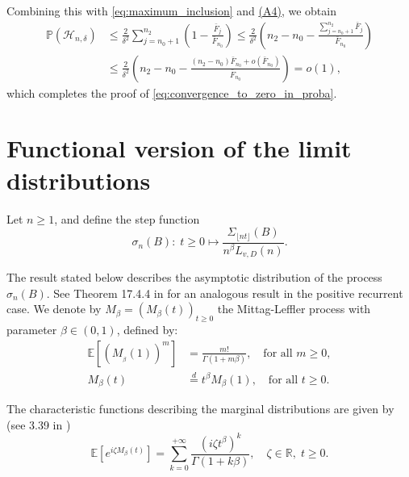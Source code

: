 \documentclass[sn-mathphys-ay]{sn-jnl}%
\renewcommand{\P}{\mathbb{P}}
\newcommand{\AssumpVelocityText}{(A4)}
\newcommand{\AssumpVelocity}{\hyperref[assumpt:AssumpVelocity]{\AssumpVelocityText}}
\begin{document}
\begin{appendices}
Combining this with \eqref{eq:maximum_inclusion} and \AssumpVelocity, we obtain
\begin{align*}
    \P\left( \mathcal{H}_{n,\delta} \right) & \leq \frac{2}{\delta^2}\sum_{j=n_0+1}^{n_2}{\left(1-\frac{\bar{F}_j}{\bar{F}_{n_0}}\right)} \leq \frac{2}{\delta^2}\left(n_2-n_0 - \frac{\sum_{j=n_0+1}^{n_2}\bar{F}_j}{\bar{F}_{n_0}}\right)       \\
                                            & \leq \frac{2}{\delta^2}\left(n_2-n_0 - \frac{\left(n_2-n_0\right){\bar{F}_{n_0}+o\left({\bar{F}_{n_0}}\right)}}{{\bar{F}_{{n_0}}}}\right)                                        = o\left(1\right),
\end{align*}
which completes the proof of \eqref{eq:convergence_to_zero_in_proba}.

\section{Functional version of the limit distributions}\label{sec:funclimit}

Let $n\geq 1$, and define the step function
\begin{equation}\label{eq:process}
    \sigma_{n}(B):\; t\geq 0 \mapsto \frac{\Sigma_{\lfloor {nt} \rfloor}(B)}{ n^{\beta}L_{v,D}(n)}.
\end{equation}

The result stated below describes the asymptotic distribution of the process
$\sigma_n(B)$. See Theorem 17.4.4 in \cite{Meyn2009} for an analogous result in the
positive recurrent case. We denote by $M_{\beta}=(M_{\beta}(t))_{t\geq 0}$ the
Mittag-Leffler process with parameter $\beta\in (0,1)$, defined by:
\begin{align*}
    \mathbb{E}\left[ \left( M_{_\beta }( 1) \right)^m \right] & = \frac{{m!}}{{\Gamma \left( {1 + m \beta } \right)}},\quad \text{for all } m \geqslant 0, \\
    {M_\beta }\left( t \right)                                & \mathop  = \limits^d {t^\beta }{M_\beta }\left( 1 \right),\quad \text{for all } t\geq 0.
\end{align*}

The characteristic functions describing the marginal distributions are given by (see
3.39 in \cite{Tjostheim-2001})
\begin{equation}\label{eq:characteristic-fn-mittag-leffler}
    \mathbb{E}\left[ {{e^{i\zeta {M_\beta }\left( t \right)}}} \right] = \sum\limits_{k = 0}^{ + \infty } {\frac{{{{\left( {i\zeta {t^\beta }} \right)}^k}}}{{\Gamma \left( {1 + k\beta } \right)}}} ,\quad \zeta  \in \mathbb{R},\;t \geqslant 0.
\end{equation}


\end{appendices}
\end{document}
